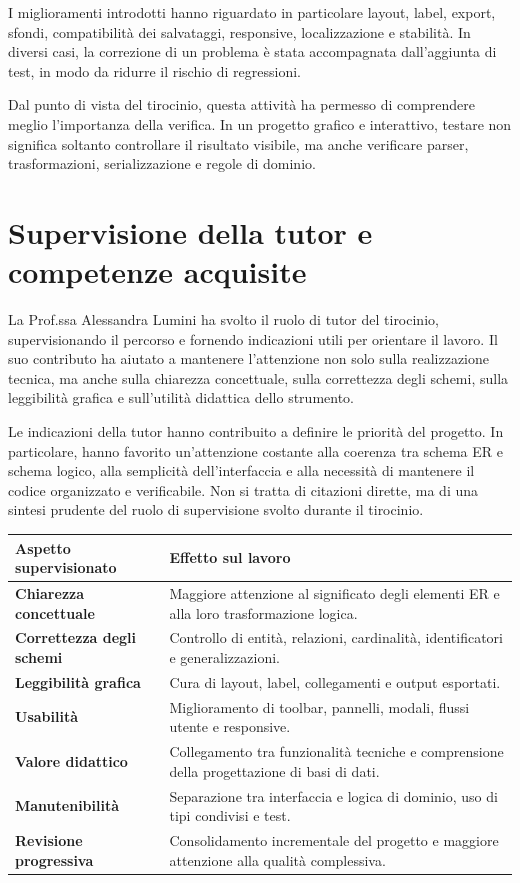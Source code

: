 \documentclass{unipd-thesis-modern}
\begin{document}
I miglioramenti introdotti hanno riguardato in particolare layout, label, export, sfondi, compatibilità dei salvataggi, responsive, localizzazione e stabilità. In diversi casi, la correzione di un problema è stata accompagnata dall'aggiunta di test, in modo da ridurre il rischio di regressioni.

Dal punto di vista del tirocinio, questa attività ha permesso di comprendere meglio l'importanza della verifica. In un progetto grafico e interattivo, testare non significa soltanto controllare il risultato visibile, ma anche verificare parser, trasformazioni, serializzazione e regole di dominio.

\chapter{Supervisione della tutor e competenze acquisite}

La Prof.ssa Alessandra Lumini ha svolto il ruolo di tutor del tirocinio, supervisionando il percorso e fornendo indicazioni utili per orientare il lavoro. Il suo contributo ha aiutato a mantenere l'attenzione non solo sulla realizzazione tecnica, ma anche sulla chiarezza concettuale, sulla correttezza degli schemi, sulla leggibilità grafica e sull'utilità didattica dello strumento.

Le indicazioni della tutor hanno contribuito a definire le priorità del progetto. In particolare, hanno favorito un'attenzione costante alla coerenza tra schema ER e schema logico, alla semplicità dell'interfaccia e alla necessità di mantenere il codice organizzato e verificabile. Non si tratta di citazioni dirette, ma di una sintesi prudente del ruolo di supervisione svolto durante il tirocinio.

\noindent\begin{tabularx}{\textwidth}{>{\bfseries}p{4cm}X}
Aspetto supervisionato & Effetto sul lavoro \\
\hline
Chiarezza concettuale & Maggiore attenzione al significato degli elementi ER e alla loro trasformazione logica. \\
Correttezza degli schemi & Controllo di entità, relazioni, cardinalità, identificatori e generalizzazioni. \\
Leggibilità grafica & Cura di layout, label, collegamenti e output esportati. \\
Usabilità & Miglioramento di toolbar, pannelli, modali, flussi utente e responsive. \\
Valore didattico & Collegamento tra funzionalità tecniche e comprensione della progettazione di basi di dati. \\
Manutenibilità & Separazione tra interfaccia e logica di dominio, uso di tipi condivisi e test. \\
Revisione progressiva & Consolidamento incrementale del progetto e maggiore attenzione alla qualità complessiva. \\
\end{tabularx}
\end{document}
